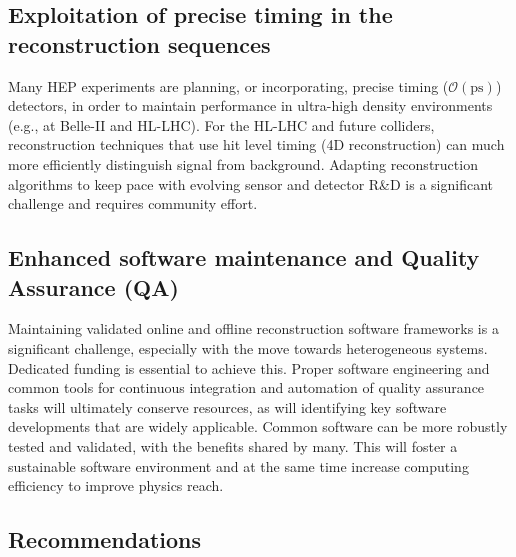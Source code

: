 \documentclass[10pt,a4paper]{article}
\begin{document}
\subsection{Exploitation of precise timing in the reconstruction
sequences}\label{exploitation-of-precise-timing-in-the-reconstruction-sequences}

Many HEP experiments are planning, or incorporating, precise timing
($\mathcal{O}(\mathrm{ps})$) detectors, in order to maintain performance in
ultra-high density environments (e.g., at Belle-II and HL-LHC). For the HL-LHC
and future colliders, reconstruction techniques that use hit level timing
(4D reconstruction) can much more efficiently distinguish signal from
background. Adapting reconstruction algorithms to keep pace with evolving sensor
and detector R\&D is a significant challenge and requires community effort.

\subsection{Enhanced software maintenance and Quality Assurance
(QA)}\label{enhanced-software-maintenance-and-quality-assurance-qa}

Maintaining validated online and offline reconstruction software frameworks is a
significant challenge, especially with the move towards heterogeneous systems.
Dedicated funding is essential to achieve this. Proper software engineering and
common tools for continuous integration and automation of quality assurance
tasks will ultimately conserve resources, as will identifying key software
developments that are widely applicable. Common software can be more robustly
tested and validated, with the benefits shared by many. This will foster a
sustainable software environment and at the same time increase computing
efficiency to improve physics reach.

\subsection{Recommendations}\label{recommendations-2}
\end{document}

